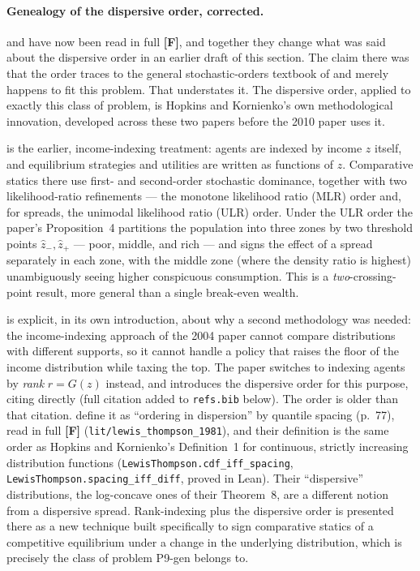 \documentclass[11pt,a4paper]{article}
\begin{document}
\paragraph{Genealogy of the dispersive order, corrected.} \citet{HopkinsKornienko2004}
and \citet{HopkinsKornienko2009} have now been read in full \textbf{[F]}, and
together they change what was said about the dispersive order in an earlier
draft of this section. The claim there was that the order traces to the general
stochastic-orders textbook of \citet{ShakedShanthikumar2007} and merely happens
to fit this problem. That understates it. The dispersive order, applied to
exactly this class of problem, is Hopkins and Kornienko's own methodological
innovation, developed across these two papers before the 2010 paper uses it.

\citet{HopkinsKornienko2004} is the earlier, income-indexing treatment: agents
are indexed by income $z$ itself, and equilibrium strategies and utilities are
written as functions of $z$. Comparative statics there use first- and
second-order stochastic dominance, together with two likelihood-ratio
refinements --- the monotone likelihood ratio (MLR) order and, for spreads, the
unimodal likelihood ratio (ULR) order. Under the ULR order the paper's
Proposition~4 partitions the population into three zones by two threshold
points $\hat z_-, \hat z_+$ --- poor, middle, and rich --- and signs the effect of
a spread separately in each zone, with the middle zone (where the density ratio
is highest) unambiguously seeing higher conspicuous consumption. This is a
\emph{two}-crossing-point result, more general than a single break-even wealth.

\citet{HopkinsKornienko2009} is explicit, in its own introduction, about why a
second methodology was needed: the income-indexing approach of the 2004 paper
cannot compare distributions with different supports, so it cannot handle a
policy that raises the floor of the income distribution while taxing the top.
The paper switches to indexing agents by \emph{rank} $r = G(z)$ instead, and
introduces the dispersive order for this purpose, citing \citet{Shaked1982}
directly (full citation added to \texttt{refs.bib} below). The order is older
than that citation. \citet{LewisThompson1981} define it as ``ordering in
dispersion'' by quantile spacing (p.~77), read in full \textbf{[F]}
(\texttt{lit/lewis\_thompson\_1981}), and their definition is the same order as
Hopkins and Kornienko's Definition~1 for continuous, strictly increasing
distribution functions (\texttt{LewisThompson.cdf\_iff\_spacing},
\texttt{LewisThompson.spacing\_iff\_diff}, proved in Lean). Their
``dispersive'' distributions, the log-concave ones of their Theorem~8, are a
different notion from a dispersive spread. Rank-indexing
plus the dispersive order is presented there as a new technique built
specifically to sign comparative statics of a competitive equilibrium under a
change in the underlying distribution, which is precisely the class of problem
P9-gen belongs to.
\end{document}
